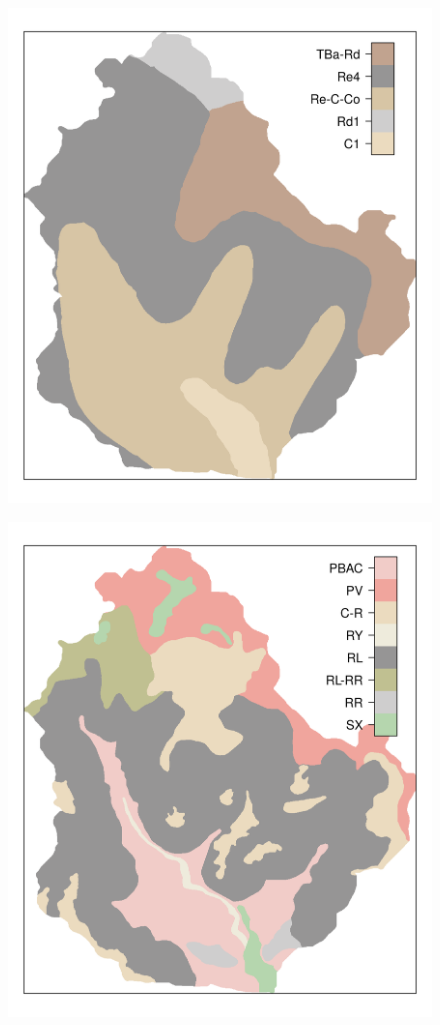 \begin{figure}[!ht]
\centering
\begin{minipage}[b]{0.45\textwidth}
\subcaption{}
\label{fig:chap05-soil-old}
\centering
\includegraphics[width = \textwidth]{fig/chap05-soil-old}
\end{minipage}
\begin{minipage}[b]{0.45\textwidth}
\subcaption{}
\label{fig:chap05-soil-new}
\centering
\includegraphics[width = \textwidth]{fig/chap05-soil-new}

\end{minipage}
\end{figure}
